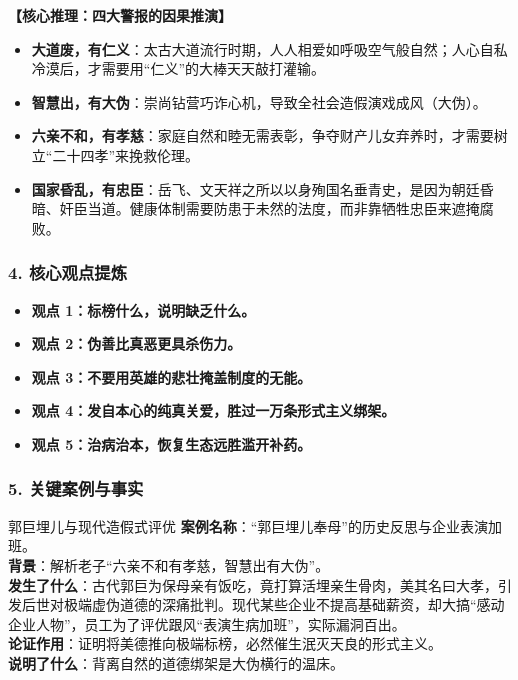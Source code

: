 \noindent\textbf{【核心推理：四大警报的因果推演】}
\begin{itemize}
    \item \textbf{大道废，有仁义}：太古大道流行时期，人人相爱如呼吸空气般自然；人心自私冷漠后，才需要用“仁义”的大棒天天敲打灌输。
    \item \textbf{智慧出，有大伪}：崇尚钻营巧诈心机，导致全社会造假演戏成风（大伪）。
    \item \textbf{六亲不和，有孝慈}：家庭自然和睦无需表彰，争夺财产儿女弃养时，才需要树立“二十四孝”来挽救伦理。
    \item \textbf{国家昏乱，有忠臣}：岳飞、文天祥之所以以身殉国名垂青史，是因为朝廷昏暗、奸臣当道。健康体制需要防患于未然的法度，而非靠牺牲忠臣来遮掩腐败。
\end{itemize}

\subsubsection{4. 核心观点提炼}
\begin{itemize}
    \item \textbf{观点 1：标榜什么，说明缺乏什么。}
    \item \textbf{观点 2：伪善比真恶更具杀伤力。}
    \item \textbf{观点 3：不要用英雄的悲壮掩盖制度的无能。}
    \item \textbf{观点 4：发自本心的纯真关爱，胜过一万条形式主义绑架。}
    \item \textbf{观点 5：治病治本，恢复生态远胜滥开补药。}
\end{itemize}

\subsubsection{5. 关键案例与事实}
\begin{CaseBox}{郭巨埋儿与现代造假式评优}
\textbf{案例名称}：“郭巨埋儿奉母”的历史反思与企业表演加班。\\
\textbf{背景}：解析老子“六亲不和有孝慈，智慧出有大伪”。\\
\textbf{发生了什么}：古代郭巨为保母亲有饭吃，竟打算活埋亲生骨肉，美其名曰大孝，引发后世对极端虚伪道德的深痛批判。现代某些企业不提高基础薪资，却大搞“感动企业人物”，员工为了评优跟风“表演生病加班”，实际漏洞百出。\\
\textbf{论证作用}：证明将美德推向极端标榜，必然催生泯灭天良的形式主义。\\
\textbf{说明了什么}：背离自然的道德绑架是大伪横行的温床。
\end{CaseBox}

